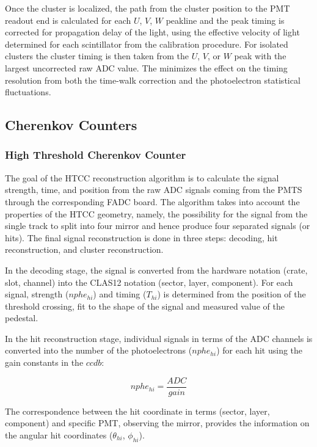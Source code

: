 \documentclass{elsart}
\begin{document}
Once the cluster is localized, the path from the cluster position to the PMT readout end is calculated for each $U$, $V$,
$W$ peakline and the peak timing is corrected for propagation delay of the light, using the effective velocity of light
determined for each scintillator from the calibration procedure.  For isolated clusters the cluster timing is then taken from
the $U$, $V$, or $W$ peak with the largest uncorrected raw ADC value.  The minimizes the effect on the timing resolution
from both the time-walk correction and the photoelectron statistical fluctuations.

\subsection{Cherenkov Counters}

\subsubsection{High Threshold Cherenkov Counter}

The goal of the HTCC reconstruction algorithm is to calculate the signal strength, time, and position from the
raw ADC signals coming from the PMTS through the corresponding FADC board. The algorithm takes into account
the properties of the HTCC geometry, namely,  the possibility for the signal from the single track to split into
four mirror and hence produce four separated signals (or hits). The final signal reconstruction is done in three
steps: decoding, hit reconstruction, and cluster reconstruction.

In the decoding stage, the signal is converted from the hardware notation (crate, slot, channel) into the CLAS12
notation (sector, layer, component).  For each signal, strength ($nphe_{hi}$) and timing ($T_{hi}$) is determined
from the position of the threshold crossing, fit to the shape of the signal and measured value of the pedestal. 

In the hit reconstruction stage, individual signals in terms of the ADC channels is converted into the number of
the photoelectrons ($nphe_{hi}$) for each hit using the gain constants in the $ccdb$: 

\begin{equation}
nphe_{hi} = \frac{ADC}{gain}
\end{equation}

The correspondence between the  hit coordinate in terms (sector, layer, component) and specific PMT, observing
the mirror,  provides the information on the angular hit coordinates ($\theta_{hi}$, $\phi_{hi}$).
\end{document}
